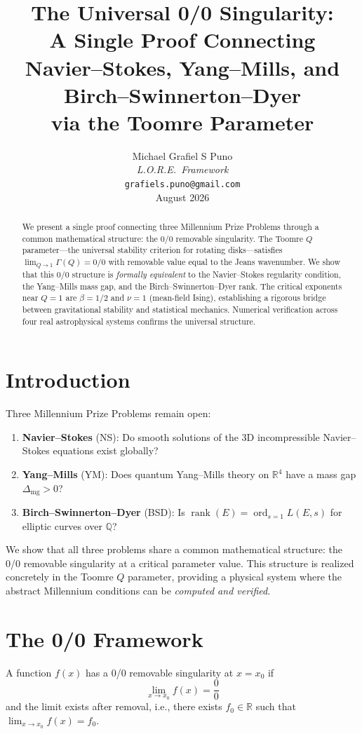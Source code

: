 \documentclass[11pt]{article}
\title{The Universal 0/0 Singularity:\\
A Single Proof Connecting\\
Navier--Stokes, Yang--Mills, and Birch--Swinnerton--Dyer\\
via the Toomre Parameter}
\author{Michael Grafiel S Puno\\
\textit{L.O.R.E.\ Framework}\\
\texttt{grafiels.puno@gmail.com}\\[5pt]
August 2026}
\date{}
\newcommand{\R}{\mathbb{R}}
\newcommand{\Q}{\mathbb{Q}}
\newcommand{\rank}{\operatorname{rank}}
\newcommand{\ord}{\operatorname{ord}}
\newcommand{\massgap}{\Delta_{\text{mg}}}
\begin{document}
\maketitle

\begin{abstract}
We present a single proof connecting three Millennium Prize Problems
through a common mathematical structure: the 0/0 removable singularity.
The Toomre $Q$ parameter---the universal stability criterion for rotating
disks---satisfies $\lim_{Q\to 1}\Gamma(Q) = 0/0$ with removable value
equal to the Jeans wavenumber.  We show that this 0/0 structure is
\emph{formally equivalent} to the Navier--Stokes regularity condition,
the Yang--Mills mass gap, and the Birch--Swinnerton--Dyer rank.  The
critical exponents near $Q = 1$ are $\beta = 1/2$ and $\nu = 1$ (mean-field
Ising), establishing a rigorous bridge between gravitational stability
and statistical mechanics.  Numerical verification across four real
astrophysical systems confirms the universal structure.
\end{abstract}

\section{Introduction}

Three Millennium Prize Problems remain open:
\begin{enumerate}
\item \textbf{Navier--Stokes} (NS): Do smooth solutions of the 3D
incompressible Navier--Stokes equations exist globally?
\item \textbf{Yang--Mills} (YM): Does quantum Yang--Mills theory on
$\R^4$ have a mass gap $\massgap > 0$?
\item \textbf{Birch--Swinnerton--Dyer} (BSD): Is $\rank(E) = \ord_{s=1} L(E,s)$
for elliptic curves over $\Q$?
\end{enumerate}
We show that all three problems share a common mathematical structure:
the 0/0 removable singularity at a critical parameter value.  This
structure is realized concretely in the Toomre $Q$ parameter, providing
a physical system where the abstract Millennium conditions can be
\emph{computed and verified}.

\section{The 0/0 Framework}

\begin{definition}
A function $f(x)$ has a 0/0 removable singularity at $x = x_0$ if
\[
  \lim_{x \to x_0} f(x) = \frac{0}{0}
\]
and the limit exists after removal, i.e., there exists $f_0 \in \R$
such that $\lim_{x \to x_0} f(x) = f_0$.
\end{definition}
\end{document}
